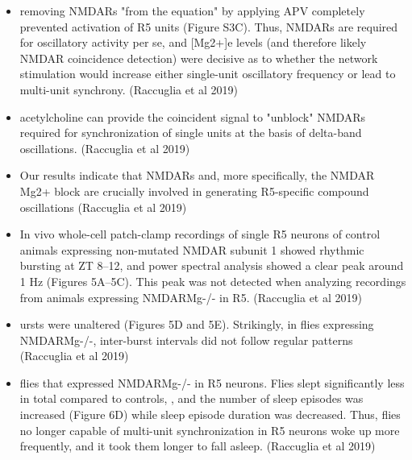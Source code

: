 \documentclass[11pt]{article}
\begin{document}
\begin{itemize}
    \item removing NMDARs "from the equation" by applying APV completely prevented activation of R5 units (Figure S3C). Thus, NMDARs are required for oscillatory activity per se, and [Mg2+]e levels (and therefore likely NMDAR coincidence detection) were decisive as to whether the network stimulation would increase either single-unit oscillatory frequency or lead to multi-unit synchrony.
    \parencite{raccugliaNetworkSpecificSynchronizationElectrical2019} (Raccuglia et al 2019)

    \item acetylcholine can provide the coincident signal to "unblock" NMDARs required for synchronization of single units at the basis of delta-band oscillations.
    \parencite{raccugliaNetworkSpecificSynchronizationElectrical2019} (Raccuglia et al 2019)

    \item Our results indicate that NMDARs and, more specifically, the NMDAR Mg2+ block are crucially involved in generating R5-specific compound oscillations
    \parencite{raccugliaNetworkSpecificSynchronizationElectrical2019} (Raccuglia et al 2019)

    \item In vivo whole-cell patch-clamp recordings of single R5 neurons of control animals expressing non-mutated NMDAR subunit 1 showed rhythmic bursting at ZT 8–12, and power spectral analysis showed a clear peak around 1 Hz (Figures 5A–5C). This peak was not detected when analyzing recordings from animals expressing NMDARMg-/- in R5.
    \parencite{raccugliaNetworkSpecificSynchronizationElectrical2019} (Raccuglia et al 2019)

    \item ursts were unaltered (Figures 5D and 5E). Strikingly, in flies expressing NMDARMg-/-, inter-burst intervals did not follow regular patterns
    \parencite{raccugliaNetworkSpecificSynchronizationElectrical2019} (Raccuglia et al 2019)

    \item flies that expressed NMDARMg-/- in R5 neurons. Flies slept significantly less in total compared to controls, , and the number of sleep episodes was increased (Figure 6D) while sleep episode duration was decreased.
    Thus, flies no longer capable of multi-unit synchronization in R5 neurons woke up more frequently, and it took them longer to fall asleep.
    \parencite{raccugliaNetworkSpecificSynchronizationElectrical2019} (Raccuglia et al 2019)


\end{itemize}
\end{document}
